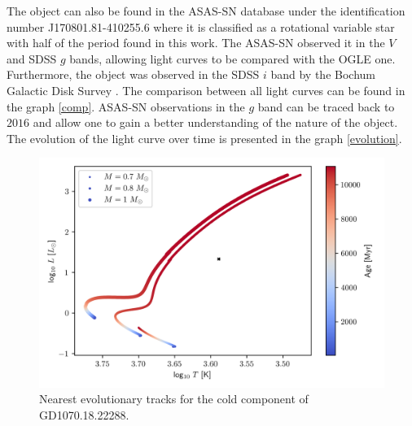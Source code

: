 \documentclass{pracalicmgr}
\begin{document}
The object can also be found in the ASAS-SN database \citep{jayasinghe_asas-sn_2019} under the identification number J170801.81-410255.6 where it is classified
as a rotational variable star with half of the period found in this work. The ASAS-SN observed it in the $V$ and SDSS $g$ bands, allowing light curves to be compared with the OGLE one.
Furthermore, the object was observed in the SDSS $i$ band by the Bochum Galactic Disk Survey \citep{hackstein_bochum_2015}. The comparison between all light curves can be found in the graph \ref{comp}.
ASAS-SN observations in the $g$ band can be traced back to $2016$ and allow one to gain a better understanding of the nature of the object.
The evolution of the light curve over time is presented in the graph \ref{evolution}.

\begin{figure}%
    \includegraphics[scale=1]{plots/GD1070.18.22288_HR.png}
    \caption{Nearest evolutionary tracks for the cold component of GD1070.18.22288.}
    \label{HR_cold}
\end{figure}
\end{document}
